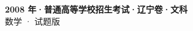 \documentclass[zihao=-4, a4paper]{ctexart}
\begin{document}
\begin{center}
  {\Large\bfseries 2008 年·普通高等学校招生考试·辽宁卷·文科}\\[4pt]
  {\large 数学 · 试题版}
\end{center}
\medskip
{}

\end{document}
